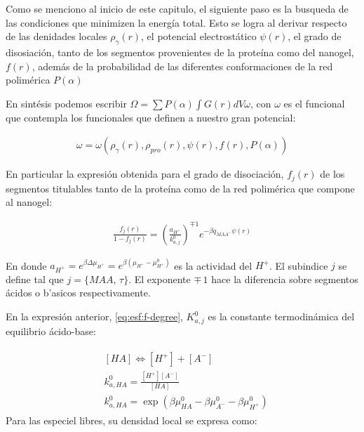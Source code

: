 Como se menciono al inicio de este capitulo, el siguiente paso es la busqueda de las condiciones que minimizen la energ\'ia total. Esto se logra al derivar respecto de las denidades locales $\rho_\gamma(r)$, el potencial electrost\'atico $\psi(r)$, el grado de disosiaci\'on, tanto de los segmentos provenientes de la prote\'ina como del nanogel, $f(r)$, adem\'as de la probabilidad de las diferentes conformaciones de la red polim\'erica $P(\alpha)$

En sint\'esis podemos escribir $\Omega = \sum P(\alpha) \int{G(r) dV\omega}$,  con $\omega$ es el funcional que contempla los funcionales que definen a nuestro gran potencial: 

\begin{align}
	\omega=\omega(\rho_\gamma(r), \rho_{pro}(r),\psi(r),f(r),P(\alpha))
	\label{eq:esf:funcionales-omega}
\end{align}


En particular la expresi\'on obtenida para el grado de disociaci\'on, $f_j(r)$ de los segmentos titulables tanto de la prote\'ina como de la red polim\'erica que compone al nanogel:

\begin{align}
	\frac{f_j(r)}{1-f_j(r)}= \left(\frac{a_{H^+}}{k^0_{a,j}}\right)^{\mp 1} e^{-\beta q_{MAA^-}\psi(r)}
	\label{eq:esf:f-degree}
\end{align}

\noindent En donde  $a_{H^+}=e^{\beta\Delta\mu_{H^+}}=e^{\beta(\mu_{H^+} -\mu^0_{H^+})}$ es la actividad del $H^+$. El subindice  $j$ se define tal que  $j =\{MAA , \, \tau \}$. El exponente $\mp \, 1$ hace la diferencia sobre segmentos \'acidos o b'asicos respectivamente.

En la expresi\'on anterior, \ref{eq:esf:f-degree}, $K^0_{a,j}$ es la constante termodin\'amica del equilibrio \'acido-base:

\begin{align}
	\begin{aligned}
		& \left[HA\right] \Longleftrightarrow [H^+] +[A^-] \\
		& k_{a,HA}^0=\frac{[H^+][A^-]}{[HA]} \\
		& k_{a,HA}^0=\exp\left(\beta\mu_{HA}^0 - \beta \mu_{A^-}^0 - \beta \mu^0_{H^+} \right)
	\end{aligned}
	\label{eq:esf:dis-rxn}
\end{align}
Para las especiel libres, su densidad local se expresa como:


